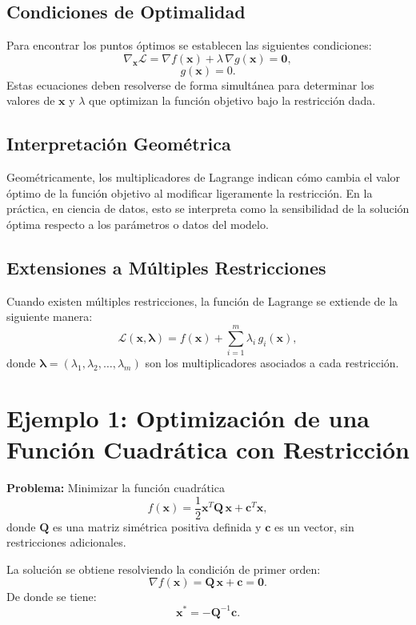 \documentclass[12pt,a4,oneside]{book}
\begin{document}
	\subsection{Condiciones de Optimalidad}
	
	Para encontrar los puntos óptimos se establecen las siguientes condiciones:
	\[
	\nabla_{\mathbf{x}} \mathcal{L} = \nabla f(\mathbf{x}) + \lambda\, \nabla g(\mathbf{x}) = \mathbf{0},
	\]
	\[
	g(\mathbf{x}) = 0.
	\]
	Estas ecuaciones deben resolverse de forma simultánea para determinar los valores de \(\mathbf{x}\) y \(\lambda\) que optimizan la función objetivo bajo la restricción dada.
	
	\subsection{Interpretación Geométrica}
	
	Geométricamente, los multiplicadores de Lagrange indican cómo cambia el valor óptimo de la función objetivo al modificar ligeramente la restricción. En la práctica, en ciencia de datos, esto se interpreta como la sensibilidad de la solución óptima respecto a los parámetros o datos del modelo.
	
	\subsection{Extensiones a Múltiples Restricciones}
	
	Cuando existen múltiples restricciones, la función de Lagrange se extiende de la siguiente manera:
	\[
	\mathcal{L}(\mathbf{x}, \boldsymbol{\lambda}) = f(\mathbf{x}) + \sum_{i=1}^m \lambda_i\, g_i(\mathbf{x}),
	\]
	donde \(\boldsymbol{\lambda} = (\lambda_1, \lambda_2, \ldots, \lambda_m)\) son los multiplicadores asociados a cada restricción.
	
	\section{Ejemplo 1: Optimización de una Función Cuadrática con Restricción}
	
	\textbf{Problema:}  
	Minimizar la función cuadrática
	\[
	f(\mathbf{x}) = \frac{1}{2}\mathbf{x}^T \mathbf{Q}\, \mathbf{x} + \mathbf{c}^T \mathbf{x},
	\]
	donde \(\mathbf{Q}\) es una matriz simétrica positiva definida y \(\mathbf{c}\) es un vector, sin restricciones adicionales.
	
	La solución se obtiene resolviendo la condición de primer orden:
	\[
	\nabla f(\mathbf{x}) = \mathbf{Q}\, \mathbf{x} + \mathbf{c} = \mathbf{0}.
	\]
	De donde se tiene:
	\[
	\mathbf{x}^* = -\mathbf{Q}^{-1}\mathbf{c}.
	\]
	
\end{document}
